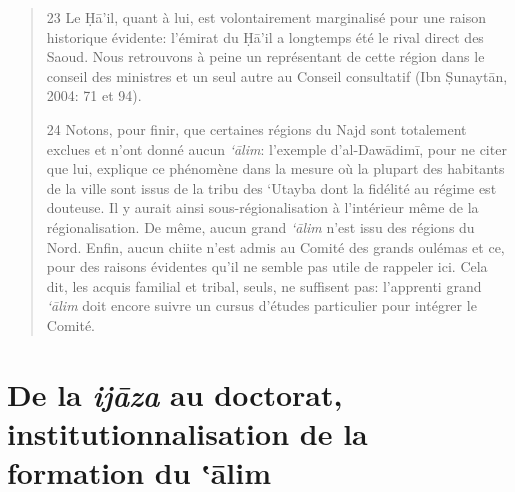 \begin{quote}
23 Le Ḥā'il, quant à lui, est volontairement marginalisé pour une raison
historique évidente: l'émirat du Ḥā'il a longtemps été le rival direct
des Saoud. Nous retrouvons à peine un représentant de cette région dans
le conseil des ministres et un seul autre au Conseil consultatif (Ibn
Ṣunaytān, 2004: 71 et 94).

24 Notons, pour finir, que certaines régions du Najd sont totalement
exclues et n'ont donné aucun \emph{`ālim}: l'exemple d'al-Dawādimī, pour
ne citer que lui, explique ce phénomène dans la mesure où la plupart des
habitants de la ville sont issus de la tribu des `Utayba dont la
fidélité au régime est douteuse. Il y aurait ainsi sous-régionalisation
à l'intérieur même de la régionalisation. De même, aucun grand
\emph{`ālim} n'est issu des régions du Nord. Enfin, aucun chiite n'est
admis au Comité des grands oulémas et ce, pour des raisons évidentes
qu'il ne semble pas utile de rappeler ici. Cela dit, les acquis familial
et tribal, seuls, ne suffisent pas: l'apprenti grand \emph{`ālim} doit
encore suivre un cursus d'études particulier pour intégrer le Comité.
\end{quote}

\hypertarget{de-la-ijux101za-au-doctorat-institutionnalisation-de-la-formation-du-ux101lim}{%
\section{\texorpdfstring{De la \emph{ijāza} au doctorat,
institutionnalisation de la formation du
‛ālim}{De la ijāza au doctorat, institutionnalisation de la formation du ‛ālim}}\label{de-la-ijux101za-au-doctorat-institutionnalisation-de-la-formation-du-ux101lim}}

